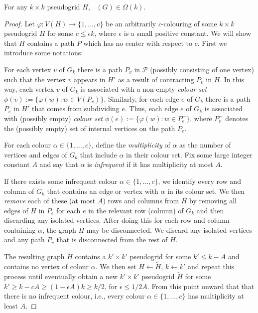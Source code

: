 \documentclass{patmorin}
\DeclareMathOperator{\chilin}{\chi_{\mathrm{lin}}}
\begin{document}
\begin{lem}
  For any $k\times k$ pseudogrid $H$, $\chilin(G)\in\Omega(k)$.
\end{lem}

\begin{proof}
  Let $\varphi:V(H)\to\{1,\ldots,c\}$ be an arbitrarily $c$-colouring of some $k\times k$ pseudogrid $H$ for some $c\le \epsilon k$, where $\epsilon$ is a small positive constant.  We will show that $H$ contains a path $P$ which has no center with respect to $c$.  First we introduce some notations: 

  For each vertex $v$ of $G_k$ there is a path $P_v$ in $\mathcal{P}$ (possibly consisting of one vertex) such that the vertex $v$ appears in $H'$ as a result of contracting $P_v$ in $H$.  In this way, each vertex $v$ of $G_k$ is associated with a non-empty \emph{colour set} $\phi(v):=\{\varphi(w):w\in V(P_v)\}$.  Similarly, for each edge $e$ of $G_k$ there is a path $P_e$ in $H'$ that comes from subdividing $e$.  Thus, each edge $e$ of $G_k$ is associated with (possibly empty) \emph{colour set} $\phi(e):=\{\varphi(w):w\in P^-_e\}$, where $P^-_e$ denotes the (possibly empty) set of internal vertices on the path $P_e$.
  
  For each colour $\alpha\in\{1,\ldots,c\}$, define the \emph{multiplicity} of $\alpha$ as the number of vertices and edges of $G_k$ that include $\alpha$ in their colour set.  Fix some large integer constant $A$ and say that $\alpha$ is \emph{infrequent} if it has multiplicity at most $A$.  
  
  If there exists some infrequent colour $\alpha\in\{1,\ldots,c\}$, we identify every row and column of $G_k$ that contains an edge or vertex with $\alpha$ in its colour set.  We then \emph{remove} each of these (at most $A$) rows and columns from $H$ by removing all edges of $H$ in $P_e$ for each $e$ in the relevant row (column) of $G_k$ and then discarding any isolated vertices.  After doing this for each row and column containing $\alpha$, the graph $H$ may be disconnected.  We discard any isolated vertices and any path $P_{v}$ that is disconnected from the rest of $H$.  
  
  The resulting graph $\tilde{H}$ contains a $k'\times k'$ pseudogrid for some $k' \le k-A$ and contains no vertex of colour $\alpha$.  We then set $H\gets \tilde{H}$, $k\gets k'$ and repeat this process until eventually obtain a new $k'\times k'$ pseudogrid $\tilde{H}$ for some $k'\ge k-cA\ge (1-\epsilon A)k \ge k/2$, for $\epsilon \le 1/2A$.  From this point onward that that there is no infrequent colour, i.e., every colour $\alpha\in\{1,\ldots,c\}$ has multiplicity at least $A$.
  

\end{proof}
\end{document}
